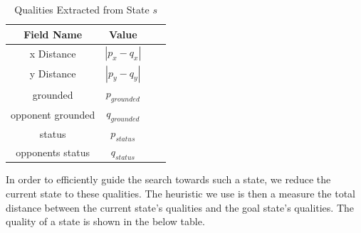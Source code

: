 \begin{table}[h]
	\centering
	\caption{Qualities Extracted from State $s$}
	\begin{tabular}{| c | c | c | c |}
		\hline
		Field Name & Value\\
		\hline
		x Distance        			& $|p_x - q_x|$ \\
		\hline            			
		y Distance        			& $|p_y - q_y|$ 	\\
		\hline
		grounded        			& $p_{grounded}$ \\
		\hline
		opponent grounded       	& $q_{grounded}$ \\
		\hline
		status       				& $p_{status}$ \\
		\hline
		opponents status        	& $q_{status}$ \\
		\hline
	\end{tabular}
	\label{qualities}
\end{table}

In order to efficiently guide the search towards such a state, we reduce the current state to these qualities. The heuristic we use is then a measure the total distance between the current state's qualities and the goal state's qualities. The quality of a state is shown in the below table.






